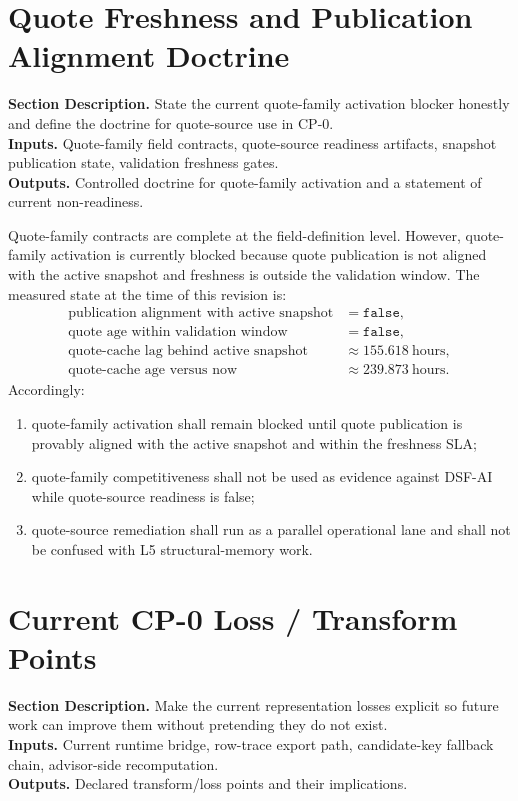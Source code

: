 \documentclass[11pt]{report}
\newcommand{\meta}[3]{\textbf{Section Description.} #1\\
\textbf{Inputs.} #2\\
\textbf{Outputs.} #3\par}
\begin{document}
\section{Quote Freshness and Publication Alignment Doctrine}
\meta{State the current quote-family activation blocker honestly and define the doctrine for quote-source use in CP-0.}{Quote-family field contracts, quote-source readiness artifacts, snapshot publication state, validation freshness gates.}{Controlled doctrine for quote-family activation and a statement of current non-readiness.}

Quote-family contracts are complete at the field-definition level. However, quote-family activation is currently blocked because quote publication is not aligned with the active snapshot and freshness is outside the validation window. The measured state at the time of this revision is:
\begin{align*}
\text{publication alignment with active snapshot} &= \texttt{false},\\
\text{quote age within validation window} &= \texttt{false},\\
\text{quote-cache lag behind active snapshot} &\approx 155.618\ \text{hours},\\
\text{quote-cache age versus now} &\approx 239.873\ \text{hours}.
\end{align*}
Accordingly:
\begin{enumerate}[leftmargin=1.2cm]
    \item quote-family activation shall remain blocked until quote publication is provably aligned with the active snapshot and within the freshness SLA;
    \item quote-family competitiveness shall not be used as evidence against DSF-AI while quote-source readiness is false;
    \item quote-source remediation shall run as a parallel operational lane and shall not be confused with L5 structural-memory work.
\end{enumerate}

\section{Current CP-0 Loss / Transform Points}
\meta{Make the current representation losses explicit so future work can improve them without pretending they do not exist.}{Current runtime bridge, row-trace export path, candidate-key fallback chain, advisor-side recomputation.}{Declared transform/loss points and their implications.}
\end{document}
